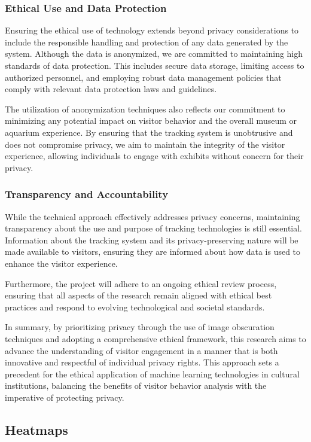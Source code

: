 \subsubsection{Ethical Use and Data Protection}
Ensuring the ethical use of technology extends beyond privacy considerations to include the responsible handling and protection of any data generated by the system. Although the data is anonymized, we are committed to maintaining high standards of data protection. This includes secure data storage, limiting access to authorized personnel, and employing robust data management policies that comply with relevant data protection laws and guidelines.

The utilization of anonymization techniques also reflects our commitment to minimizing any potential impact on visitor behavior and the overall museum or aquarium experience. By ensuring that the tracking system is unobtrusive and does not compromise privacy, we aim to maintain the integrity of the visitor experience, allowing individuals to engage with exhibits without concern for their privacy.

\subsubsection{Transparency and Accountability}
While the technical approach effectively addresses privacy concerns, maintaining transparency about the use and purpose of tracking technologies is still essential. Information about the tracking system and its privacy-preserving nature will be made available to visitors, ensuring they are informed about how data is used to enhance the visitor experience.

Furthermore, the project will adhere to an ongoing ethical review process, ensuring that all aspects of the research remain aligned with ethical best practices and respond to evolving technological and societal standards.

In summary, by prioritizing privacy through the use of image obscuration techniques and adopting a comprehensive ethical framework, this research aims to advance the understanding of visitor engagement in a manner that is both innovative and respectful of individual privacy rights. This approach sets a precedent for the ethical application of machine learning technologies in cultural institutions, balancing the benefits of visitor behavior analysis with the imperative of protecting privacy.


\subsection{Heatmaps}
\label{sec:heatmaps}

